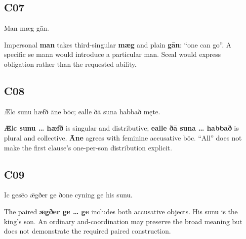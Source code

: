 \subsection*{C07}

\par\begin{minipage}{\linewidth}\raggedright
Man mæg gān.

Impersonal \textbf{man} takes third-singular \textbf{mæg} and plain \textbf{gān}: “one can go”. A specific se mann would introduce a particular man. Sceal would express obligation rather than the requested ability.

\end{minipage}\par\addvspace{4pt}

\subsection*{C08}

\par\begin{minipage}{\linewidth}\raggedright
Ǣlc sunu hæfð āne bōc; ealle ðā suna habbað męte.

\textbf{Ǣlc sunu … hæfð} is singular and distributive; \textbf{ealle ðā suna … habbað} is plural and collective. \textbf{Āne} agrees with feminine accusative bōc. “All” does not make the first clause’s one-per-son distribution explicit.

\end{minipage}\par\addvspace{4pt}

\subsection*{C09}

\par\begin{minipage}{\linewidth}\raggedright
Ic gesēo ǣgðer ge ðone cyning ge his sunu.

The paired \textbf{ǣgðer ge … ge} includes both accusative objects. His sunu is the king’s son. An ordinary and-coordination may preserve the broad meaning but does not demonstrate the required paired construction.

\end{minipage}\par\addvspace{4pt}

